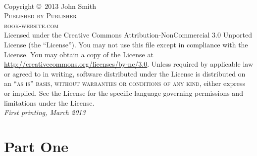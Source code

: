\documentclass[11pt,fleqn]{book} %
\begin{document}

\newpage
~\vfill
\thispagestyle{empty}

\noindent Copyright \copyright\ 2013 John Smith\\ %

\noindent \textsc{Published by Publisher}\\ %

\noindent \textsc{book-website.com}\\ %

\noindent Licensed under the Creative Commons Attribution-NonCommercial 3.0 Unported License (the ``License''). You may not use this file except in compliance with the License. You may obtain a copy of the License at \url{http://creativecommons.org/licenses/by-nc/3.0}. Unless required by applicable law or agreed to in writing, software distributed under the License is distributed on an \textsc{``as is'' basis, without warranties or conditions of any kind}, either express or implied. See the License for the specific language governing permissions and limitations under the License.\\ %

\noindent \textit{First printing, March 2013} %



\pagestyle{empty} %

\tableofcontents %

\cleardoublepage %

\pagestyle{fancy} %


\part{Part One}
\end{document}
